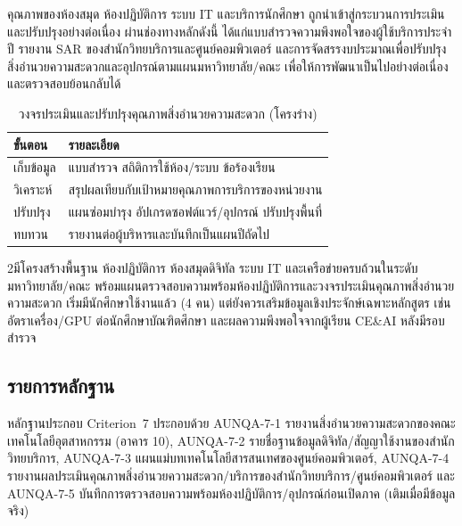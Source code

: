 
คุณภาพของห้องสมุด ห้องปฏิบัติการ ระบบ IT และบริการนักศึกษา ถูกนำเข้าสู่กระบวนการประเมินและปรับปรุงอย่างต่อเนื่อง ผ่านช่องทางหลักดังนี้
ได้แก่แบบสำรวจความพึงพอใจของผู้ใช้บริการประจำปี รายงาน SAR ของสำนักวิทยบริการและศูนย์คอมพิวเตอร์ และการจัดสรรงบประมาณเพื่อปรับปรุงสิ่งอำนวยความสะดวกและอุปกรณ์ตามแผนมหาวิทยาลัย/คณะ เพื่อให้การพัฒนาเป็นไปอย่างต่อเนื่องและตรวจสอบย้อนกลับได้

\begin{table}[H]
  \centering
  \caption{วงจรประเมินและปรับปรุงคุณภาพสิ่งอำนวยความสะดวก (โครงร่าง)}
  \label{tbl:c7_facility_qa_cycle}
  \begingroup
  \small
  \begin{tabularx}{\linewidth}{|>{\raggedright\arraybackslash}p{2.8cm}|Y|}
    \hline
    \textbf{ขั้นตอน} & \textbf{รายละเอียด} \\
    \hline
    เก็บข้อมูล & แบบสำรวจ สถิติการใช้ห้อง/ระบบ ข้อร้องเรียน \\
    \hline
    วิเคราะห์ & สรุปผลเทียบกับเป้าหมายคุณภาพการบริการของหน่วยงาน \\
    \hline
    ปรับปรุง & แผนซ่อมบำรุง อัปเกรดซอฟต์แวร์/อุปกรณ์ ปรับปรุงพื้นที่ \\
    \hline
    ทบทวน & รายงานต่อผู้บริหารและบันทึกเป็นแผนปีถัดไป \\
    \hline
  \end{tabularx}
  \endgroup
\end{table}

\begin{selfassessmentbox}{2}{มีโครงสร้างพื้นฐาน ห้องปฏิบัติการ ห้องสมุดดิจิทัล ระบบ IT และเครือข่ายครบถ้วนในระดับมหาวิทยาลัย/คณะ พร้อมแผนตรวจสอบความพร้อมห้องปฏิบัติการและวงจรประเมินคุณภาพสิ่งอำนวยความสะดวก เริ่มมีนักศึกษาใช้งานแล้ว (4 คน) แต่ยังควรเสริมข้อมูลเชิงประจักษ์เฉพาะหลักสูตร เช่น อัตราเครื่อง/GPU ต่อนักศึกษาบัณฑิตศึกษา และผลความพึงพอใจจากผู้เรียน CE\&AI หลังมีรอบสำรวจ}
\end{selfassessmentbox}

\subsection*{รายการหลักฐาน}

หลักฐานประกอบ Criterion~7 ประกอบด้วย AUNQA-7-1 รายงานสิ่งอำนวยความสะดวกของคณะเทคโนโลยีอุตสาหกรรม (อาคาร 10), AUNQA-7-2 รายชื่อฐานข้อมูลดิจิทัล/สัญญาใช้งานของสำนักวิทยบริการ, AUNQA-7-3 แผนแม่บทเทคโนโลยีสารสนเทศของศูนย์คอมพิวเตอร์, AUNQA-7-4 รายงานผลประเมินคุณภาพสิ่งอำนวยความสะดวก/บริการของสำนักวิทยบริการ/ศูนย์คอมพิวเตอร์ และ AUNQA-7-5 บันทึกการตรวจสอบความพร้อมห้องปฏิบัติการ/อุปกรณ์ก่อนเปิดภาค (เติมเมื่อมีข้อมูลจริง)
